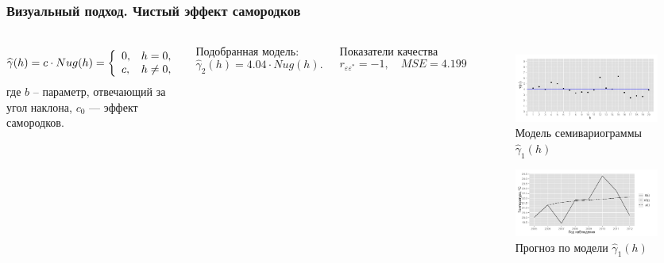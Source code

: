 \documentclass[10pt,pdf,aspectratio=169,hyperref={unicode}]{beamer}
\begin{document}
\begin{frame}
  \frametitle{Визуальный подход. \small{Чистый эффект самородков}}
  \begin{columns}[c]
  \column{3in}
  \begin{equation}\begin{gathered}
  \label{eq:nug}
    \widehat{\gamma}(h) = c \cdot Nug(h) = \left\{
   \begin{array}{l l}
     0, & h = 0, \\
     c, & h \neq 0,
   \end{array} \right.
  \end{gathered}\end{equation}
  где $ b $ -- параметр, отвечающий за угол наклона, $ c_0 $ --- эффект самородков.

  \vspace{0.5em}

  Подобранная модель:
  \begin{equation}
  \label{eq:gamma2}
    \widehat{\gamma}_2(h) = 4.04 \cdot Nug(h).
  \end{equation}

  Показатели качества
  \begin{equation*}
    r_{\varepsilon\varepsilon^{*}} = -1, \quad MSE = 4.199
  \end{equation*}

  \column{3in}
  \vspace{-14.5pt}
  \begin{figure}[H]
    \includegraphics[width=0.9\linewidth]{../../figures/variogram/lin-fit-modeled.png} \\
    \caption{Модель семивариограммы $\widehat{\gamma}_1(h)$}
    \includegraphics[width=0.9\linewidth]{../../figures/variogram/lin-fit-cross-prediction.png}
    \caption{Прогноз по модели $\widehat{\gamma}_1(h)$}
  \end{figure}
  \end{columns}
\end{frame}
\end{document}
